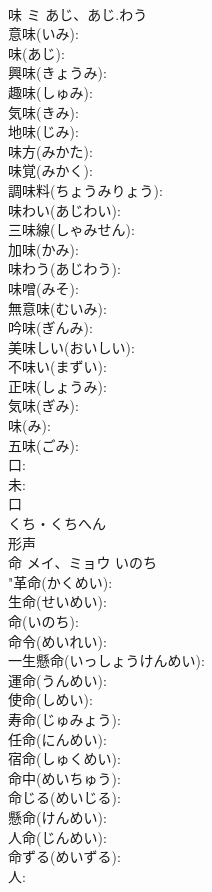 \documentclass[8pt]{extreport}
\begin{document}
\begin{CJK}{UTF8}{min}
\\	味	ミ	あじ、あじ.わう		
\\	意味(いみ): 
\\	味(あじ): 
\\	興味(きょうみ): 
\\	趣味(しゅみ): 
\\	気味(きみ): 
\\	地味(じみ): 
\\	味方(みかた): 
\\	味覚(みかく): 
\\	調味料(ちょうみりょう): 
\\	味わい(あじわい): 
\\	三味線(しゃみせん): 
\\	加味(かみ): 
\\	味わう(あじわう): 
\\	味噌(みそ): 
\\	無意味(むいみ): 
\\	吟味(ぎんみ): 
\\	美味しい(おいしい): 
\\	不味い(まずい): 
\\	正味(しょうみ): 
\\	気味(ぎみ): 
\\	味(み): 
\\	五味(ごみ): 
\\	口: 
\\	未: 
\\	口	
\\	くち・くちへん	
\\	形声 
\\	命	メイ、ミョウ	いのち		
\\	"革命(かくめい): 
\\	生命(せいめい): 
\\	命(いのち): 
\\	命令(めいれい): 
\\	一生懸命(いっしょうけんめい): 
\\	運命(うんめい): 
\\	使命(しめい): 
\\	寿命(じゅみょう): 
\\	任命(にんめい): 
\\	宿命(しゅくめい): 
\\	命中(めいちゅう): 
\\	命じる(めいじる): 
\\	懸命(けんめい): 
\\	人命(じんめい): 
\\	命ずる(めいずる): 
\\	人: 

\end{CJK}
\end{document}
